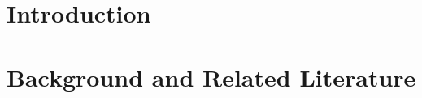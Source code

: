 \documentclass[openbib,12pt]{article}  %
\begin{document}
\begin{abstract}
\vspace{0in}
\end{abstract}

\tableofcontents

\newpage

\section{Introduction}\label{EMIL_Section:intro}


\section{Background and Related Literature}\label{EMIL_Section:inst}








%

%

%

\newpage
\appendix
\end{document}
